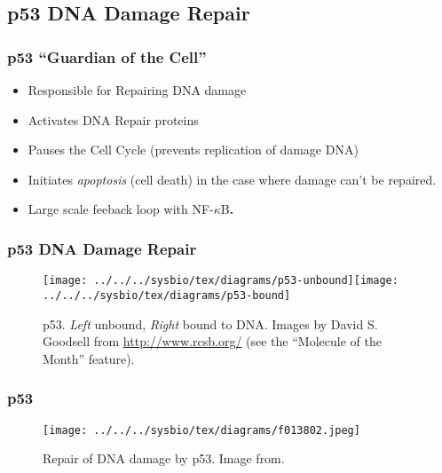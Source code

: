 \subsection{p53 DNA Damage Repair}

\begin{frame}

  \frametitle{p53 ``Guardian of the Cell''}

  \begin{itemize}
  \item Responsible for Repairing DNA damage
  \item Activates DNA Repair proteins
  \item Pauses the Cell Cycle (prevents replication of damage DNA)
  \item Initiates \emph{apoptosis} (cell death) in the case where damage can't
    be repaired.
  \item Large scale feeback loop with NF-$\kappa$B\textbf{.}
  \end{itemize}

\end{frame}


\begin{frame}
  \frametitle{p53 DNA Damage Repair}

  \begin{figure}
    \texttt{[image: ../../../sysbio/tex/diagrams/p53-unbound]}\hfill{}\texttt{[image: ../../../sysbio/tex/diagrams/p53-bound]}

    \caption{p53. \emph{Left} unbound, \emph{Right }bound to DNA. Images by David
      S. Goodsell from \protect\url{http://www.rcsb.org/} (see the {}``Molecule
      of the Month'' feature).}

  \end{figure}



\end{frame}


\begin{frame}
  \frametitle{p53}

  \begin{figure}
    \begin{centering}
      \texttt{[image: ../../../sysbio/tex/diagrams/f013802.jpeg]}
      \par\end{centering}

    \caption{Repair of DNA damage by p53. Image from\citet{Goodsell:p53tumor99}.}

  \end{figure}

\end{frame}


